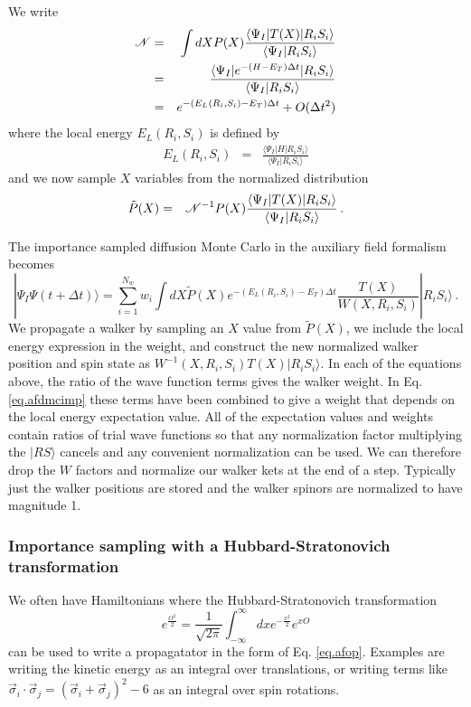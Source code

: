  We write
 \begin{eqnarray}
 {\cal N} &=& \int dX P(X)\frac{\langle \Psi_I|T(X)|R_iS_i\rangle}
 {\langle \Psi_I|R_iS_i\rangle}
 \nonumber\\
 &=& 
 \frac{\langle \Psi_I|e^{-(H-E_T)\Delta t} |R_iS_i\rangle}
 {\langle \Psi_I|R_iS_i\rangle}
 \nonumber\\
 &=& e^{-(E_L(R_i,S_i) -E_T)\Delta t} + O(\Delta t^2)
 \end{eqnarray}
 where the local energy $E_L(R_i,S_i)$ is defined by
 \begin{eqnarray}
 E_L(R_i,S_i) &=& 
 \frac{\langle \Psi_I|H|R_iS_i\rangle}
 {\langle \Psi_I|R_iS_i\rangle}
 \end{eqnarray}
 and we now sample $X$ variables from the normalized distribution
 \begin{eqnarray}
 \tilde P(X) &=& {\cal N}^{-1}
 P(X)\frac{\langle \Psi_I|T(X)|R_iS_i\rangle}{\langle \Psi_I|R_iS_i\rangle}\,.
 \end{eqnarray}
 
 
 The importance sampled diffusion Monte Carlo in the auxiliary field
 formalism becomes
 \begin{equation}
 \label{eq.afdmcimp}
 |\Psi_I\Psi(t+\Delta t)\rangle = \sum_{i=1}^{N_w}
 w_i \int dX \tilde P(X) e^{-(E_L(R_i,S_i) -E_T)\Delta t}
 \frac{T(X)}{W(X,R_i,S_i)} |R_iS_i\rangle \,.
 \end{equation}
 We  propagate a walker by sampling an $X$ value from $\tilde P(X)$,
 we include the local energy expression in the weight, and
 construct the new normalized
 walker position and spin state as $W^{-1}(X,R_i,S_i)T(X)|R_iS_i\rangle$.
 In each of the equations above,
 the ratio of the wave function terms gives the walker weight.
 In Eq. \ref{eq.afdmcimp} these terms have been combined to give a
 weight that depends on the local energy expectation value.
 All of the expectation values and weights
 contain ratios of trial wave functions
 so that any normalization factor multiplying the $|R S\rangle$ cancels
 and any convenient normalization can be used. We can therefore drop
 the $W$ factors and normalize our walker kets at the end of a step.
 Typically just the 
 walker positions are stored and the walker spinors are normalized to
 have magnitude 1.
 
 \subsubsection{Importance sampling with a Hubbard-Stratonovich transformation}
 We often have Hamiltonians where
 the Hubbard-Stratonovich transformation
 \begin{equation}
 e^{\frac{O^2}{2}} = \frac{1}{\sqrt{2\pi}}
 \int_{-\infty}^\infty dx e^{-\frac{x^2}{2}} e^{x O}
 \end{equation}
 can be used
 to write a propagatator in the form of Eq. \ref{eq.afop}. Examples are
 writing the kinetic energy as an integral over translations, or writing
 terms like $\vec \sigma_i \cdot \vec \sigma_j =
 (\vec \sigma_i +\vec \sigma_j)^2 -6$ as an integral over
 spin rotations.
 
